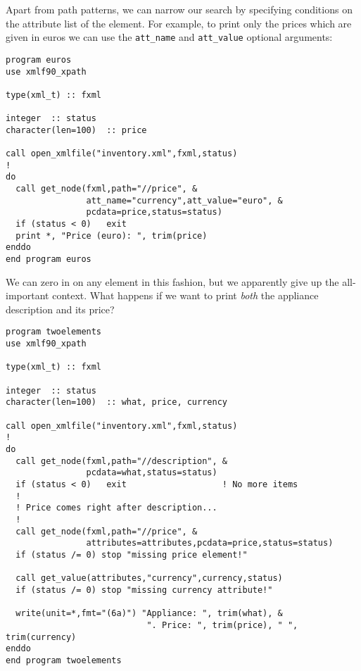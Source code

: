 \documentclass[11pt]{article}
\begin{document}
Apart from path patterns, we can narrow our search by specifying
conditions on the attribute list of the element. For example, to print
only the prices which are given in euros we can use the
\texttt{att\_name} and \texttt{att\_value} optional arguments:
%
\begin{verbatim}
program euros
use xmlf90_xpath

type(xml_t) :: fxml

integer  :: status
character(len=100)  :: price

call open_xmlfile("inventory.xml",fxml,status)
!
do
  call get_node(fxml,path="//price", &
                att_name="currency",att_value="euro", &
                pcdata=price,status=status)
  if (status < 0)   exit
  print *, "Price (euro): ", trim(price)
enddo
end program euros
\end{verbatim}
%
We can zero in on any element in this fashion, but we apparently give
up the all-important context. What happens if we want to print
\textsl{both} the appliance description and its price?
%
\begin{verbatim}
program twoelements
use xmlf90_xpath

type(xml_t) :: fxml

integer  :: status
character(len=100)  :: what, price, currency

call open_xmlfile("inventory.xml",fxml,status)
!
do
  call get_node(fxml,path="//description", &
                pcdata=what,status=status)
  if (status < 0)   exit                   ! No more items
  !
  ! Price comes right after description...
  !
  call get_node(fxml,path="//price", &
                attributes=attributes,pcdata=price,status=status)
  if (status /= 0) stop "missing price element!"
  
  call get_value(attributes,"currency",currency,status)
  if (status /= 0) stop "missing currency attribute!"
  
  write(unit=*,fmt="(6a)") "Appliance: ", trim(what), &
                            ". Price: ", trim(price), " ", trim(currency)
enddo
end program twoelements
\end{verbatim}
%
\end{document}
